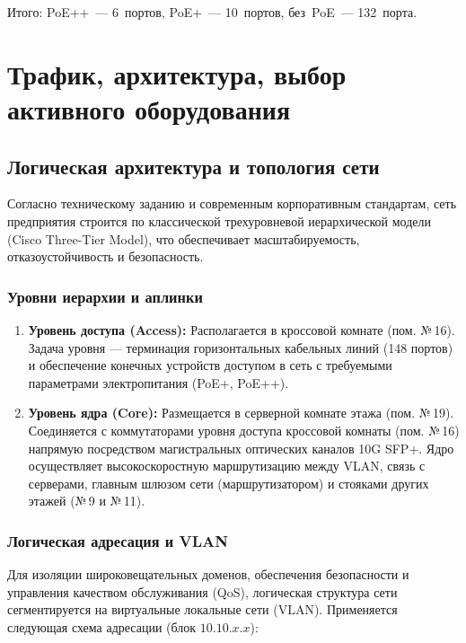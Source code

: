 \documentclass{bmstu}
\begin{document}
Итого: PoE++~--- 6~портов, PoE+~--- 10~портов, без~PoE~--- 132~порта.

\chapter{Трафик, архитектура, выбор активного оборудования}

\section{Логическая архитектура и топология сети}

Согласно техническому заданию и современным корпоративным стандартам, сеть предприятия строится по классической трехуровневой иерархической модели (Cisco Three-Tier Model), что обеспечивает масштабируемость, отказоустойчивость и безопасность.

\subsection{Уровни иерархии и аплинки}

\begin{enumerate}
    \item \textbf{Уровень доступа (Access):} Располагается в кроссовой комнате (пом. №\,16). Задача уровня — терминация горизонтальных кабельных линий (148 портов) и обеспечение конечных устройств доступом в сеть с требуемыми параметрами электропитания (PoE+, PoE++). 
    
    \item \textbf{Уровень ядра (Core):} Размещается в серверной комнате этажа (пом. №\,19). Соединяется с коммутаторами уровня доступа кроссовой комнаты (пом. №\,16) напрямую посредством магистральных оптических каналов 10G SFP+. Ядро осуществляет высокоскоростную маршрутизацию между VLAN, связь с серверами, главным шлюзом сети (маршрутизатором) и стояками других этажей (№\,9 и №\,11).
\end{enumerate}

\subsection{Логическая адресация и VLAN}

Для изоляции широковещательных доменов, обеспечения безопасности и управления качеством обслуживания (QoS), логическая структура сети сегментируется на виртуальные локальные сети (VLAN). Применяется следующая схема адресации (блок $10.10.x.x$):
\end{document}
